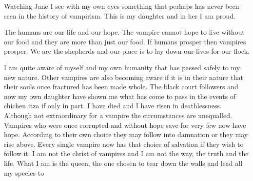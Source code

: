 Watching Jane I see with my own eyes something that perhaps has never been seen in the history of vampirism. This is my daughter and in her I am proud.

The humans are our life and our hope. The vampire cannot hope to live without our food and they are more than just our food. If humans prosper then vampires prosper. We are the shepherds and our place is to lay down our lives for our flock. 

I am quite aware of myself and my own humanity that has passed safely to my new nature. Other vampires are also becoming aware if it is in their nature that their souls once fractured has been made whole. The black court followers and now my own daughter have shown me what has come to pass in the events of chichen itza if only in part. I have died and I have risen in deathlessness. Although not extraordinary for a vampire the circumstances are unequalled. Vampires who were once corrupted and without hope save for very few now have hope. According to their own choice they may follow into damnation or they may rise above. Every single vampire now has that choice of salvation if they wish to follow it. I am not the christ of vampires and I am not the way, the truth and the life. What I am is the queen, the one chosen to tear down the walls and lead all my species to  

